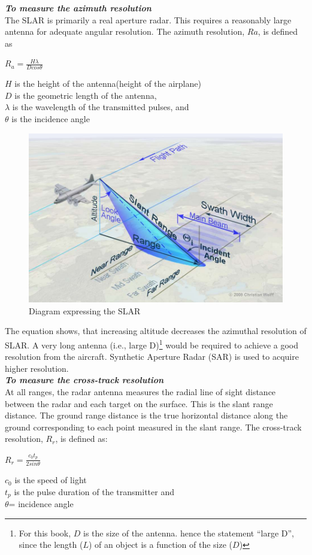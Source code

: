 \textbf{\textit{To measure the azimuth resolution}}\\
The SLAR is primarily a real aperture radar. This requires a reasonably large antenna for adequate angular resolution. The azimuth resolution, $ Ra $, is defined as
\begin{center}
$R_{a}=\frac{H \lambda}{D cos\theta}$
\end{center}
$ H $ is the height of the antenna(height of the airplane)\\
$ D $ is the geometric length of the antenna,\\
$\lambda$ is the wavelength of the transmitted pulses, and\\
$\theta$ is the incidence angle
\begin{figure}[h]
\centering
\includegraphics[scale=0.2]{./graphics/SLAR2}
\caption{Diagram expressing the SLAR}
\end{figure}

The equation shows, that increasing altitude decreases the azimuthal resolution of SLAR. A very long antenna (i.e., large D)\footnote{For this book, $D$ is the size of the antenna. hence the statement \textquotedblleft large D\textquotedblright, since the length ($L$) of an object is a function of the size ($D$)} would be required to achieve a good resolution from the aircraft. Synthetic Aperture Radar (SAR) is used to acquire higher resolution.\\

\textit{\textbf{To measure the cross-track resolution }}\\
At all ranges, the radar antenna measures the radial line of sight distance between the radar and each target on the surface. This is the slant range distance. The ground range distance is the true horizontal distance along the ground corresponding to each point measured in the slant range. The cross-track resolution, $R_{r}$, is defined as:  
\begin{center}
$R_{r}=\frac{c_{0} t_{p}}{2 sin\theta}$
\end{center}
$c_{0}$ is the speed of light\\
$t_{p}$ is the pulse duration of the transmitter and\\
$\theta$= incidence angle

